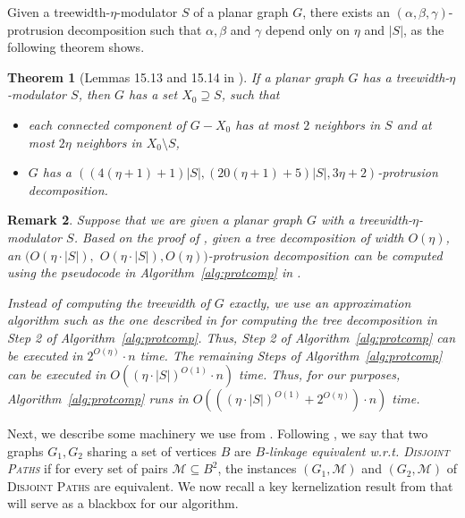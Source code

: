 \documentclass{article}
\newtheorem{theorem}{Theorem}
\newtheorem{remark}[theorem]{Remark}
\numberwithin{claimcounter}{lemma}
\newcommand{\dispaths}{\textsc{Disjoint Paths}\xspace}
\begin{document}
Given a treewidth-$\eta$-modulator $S$ of a planar graph $G$, there exists an $(\alpha,\beta,\gamma)$-protrusion decomposition such that $\alpha,\beta$ and $\gamma$ depend only on $\eta$ and $|S|$, as the following theorem shows.


\begin{theorem}[Lemmas 15.13 and 15.14 in \cite{kernelbook}]
\label{thm:protrusioncomp}
    If a planar graph $G$ has a treewidth-$\eta$-modulator $S$, then
$G$ has a set $X_0 \supseteq S$, such that 
\begin{itemize}
\item each connected component of $G-X_0$ has at most $2$ neighbors in $S$
and at most $2\eta$ neighbors in $X_0\setminus S$,
\item $G$ has a $\left(\left(4\left(\eta+1\right)+1\right)\left|S\right|,\left(20(\eta+1)+5\right)\left|S\right|,3\eta+2\right)$-protrusion
decomposition.
\end{itemize}
\end{theorem}

\begin{remark} \label{rem:prottime}
    Suppose that we are given a planar graph $G$ with a treewidth-$\eta$-modulator $S$. Based on the proof of \cite[Lemmas 15.13 and 15.14]{kernelbook}, given a tree decomposition of width $O(\eta)$, an $(O(\eta \cdot |S|),$ $ O(\eta \cdot |S|), O(\eta))$-protrusion decomposition can be computed using the pseudocode in Algorithm~\ref{alg:protcomp} in .
    
    Instead of computing the treewidth of $G$ exactly, we use an approximation algorithm such as the one described in \cite{treewidthSingle} for computing the tree decomposition in Step 2 of Algorithm~\ref{alg:protcomp}. Thus, Step 2 of  Algorithm~\ref{alg:protcomp} can be executed in $2^{O(\eta)}\cdot n$ time. The remaining Steps of Algorithm~\ref{alg:protcomp}  can be executed in $O({(\eta \cdot |S|)}^{O(1)}\cdot n)$ time.
    Thus, for our purposes, Algorithm~\ref{alg:protcomp} runs in $O(({(\eta \cdot |S|)}^{O(1)}+ 2^{O(\eta)})\cdot n)$ time.
    \end{remark}



Next, we describe some machinery we use from \cite{DBLP:conf/focs/0001Z23}. Following \cite{DBLP:conf/focs/0001Z23}, we say that two graphs $G_1, G_2$ sharing a set of vertices $B$ are {\em $B$-linkage equivalent w.r.t. \dispaths} if for every set of pairs $\mathcal{M} \subseteq B^2$, the instances $(G_1,\mathcal{M})$ and $(G_2,\mathcal{M})$ of \dispaths are equivalent. We now recall a key kernelization result from \cite{DBLP:conf/focs/0001Z23} that will serve as a blackbox for our algorithm.
\end{document}

